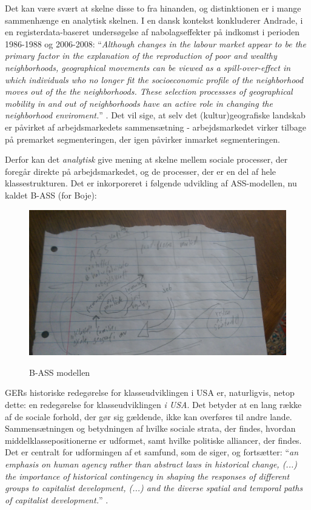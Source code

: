 Det kan være svært at skelne disse to fra hinanden, og distinktionen er i mange sammenhænge en analytisk skelnen. I en dansk kontekst konkluderer Andrade, i en registerdata-baseret undersøgelse af nabolagseffekter på indkomst i perioden 1986-1988 og 2006-2008: “\emph{Although changes in the labour market appear to be the primary factor in the explanation of the reproduction of poor and wealthy neighborhoods, geographical movements can be viewed as a spill-over-effect in which individuals who no longer fit the socioeconomic profile of the neighborhood moves out of the the neighborhoods. These selection processses of geographical mobility in and out of neighborhoods have an active role in changing the neighborhood enviroment.}” \parencite[134]{Andrade2014}. Det vil sige, at selv det (kultur)geografiske landskab er påvirket af arbejdsmarkedets sammensætning - arbejdsmarkedet virker tilbage på premarket segmenteringen, der igen påvirker inmarket segmenteringen. 

Derfor kan det \emph{analytisk} give mening at skelne mellem sociale processer, der foregår direkte på arbejdsmarkedet, og de processer, der er en del af hele klassestrukturen. Det er inkorporeret i følgende udvikling af ASS-modellen, nu kaldet B-ASS (for Boje): 
%
\begin{figure}[H]
\begin{centering}
	\caption{B-ASS modellen}
	\includegraphics[width=\textwidth]{fig/B-ASS-model.jpg}
	\label{fig_B-ASSmodel}
\end{centering}
\end{figure}
%


GERs historiske redegørelse for klasseudviklingen i USA er, naturligvis, netop dette: en redegørelse for klasseudviklingen \emph{i USA}. Det betyder at en lang række af de sociale forhold, der gør sig gældende, ikke kan overføres til andre lande. Sammensætningen og betydningen af hvilke sociale strata, der findes, hvordan middelklassepositionerne er udformet, samt hvilke politiske alliancer, der findes. Det er centralt for udformingen af et samfund, som de siger, og fortsætter: “\emph{an emphasis on human agency rather than abstract laws in historical change, (...) the importance of historical contingency in shaping the responses of different groups to capitalist development, (...) and the diverse spatial and temporal paths of capitalist development.}” \parencite[21]{Gordon1982}. 

